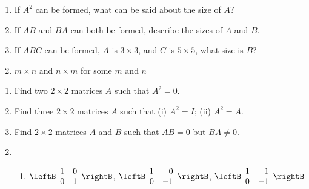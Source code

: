 \begin{multicols}{2}
\begin{ex}
\begin{enumerate}[label={\alph*.}]
\item If $A^{2}$ can be formed, what can be said about the size of $A$?

\item If $AB$ and $BA$ can both be formed, describe the sizes of $A$ and $B$.

\item If $ABC$ can be formed, $A$ is $3 \times 3$, and $C$ is $5 \times 5$, what size is $B$?

\end{enumerate}
\begin{sol}
\begin{enumerate}[label={\alph*.}]
\setcounter{enumi}{1}
\item $m \times n$ and $n \times m$ for some $m$ and $n$

\end{enumerate}
\end{sol}
\end{ex}

\begin{ex}
\begin{enumerate}[label={\alph*.}]
\item Find two $2 \times 2$ matrices $A$ such that $A^{2} = 0$.

\item Find three $2 \times 2$ matrices $A$ such that (i) $A^{2} = I$; (ii) $A^{2} = A$.

\item Find $2 \times 2$ matrices $A$ and $B$ such that $AB = 0$ but $BA \neq 0$.

\end{enumerate}
\begin{sol}
\begin{enumerate}[label={\alph*.}]
\setcounter{enumi}{1}
\item
\begin{enumerate}[label={\roman*.}]
\item
$
\leftB \begin{array}{rr}
1 & 0 \\
0 & 1
\end{array} \rightB$, $\leftB \begin{array}{rr}
1 & 0 \\
0 & -1
\end{array} \rightB$, $\leftB \begin{array}{rr}
1 & 1 \\
0 & -1
\end{array} \rightB
$


\end{enumerate}
\end{enumerate}
\end{sol}
\end{ex}
\end{multicols}
